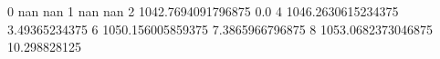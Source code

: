0 nan nan
1 nan nan
2 1042.7694091796875 0.0
4 1046.2630615234375 3.49365234375
6 1050.156005859375 7.3865966796875
8 1053.0682373046875 10.298828125
